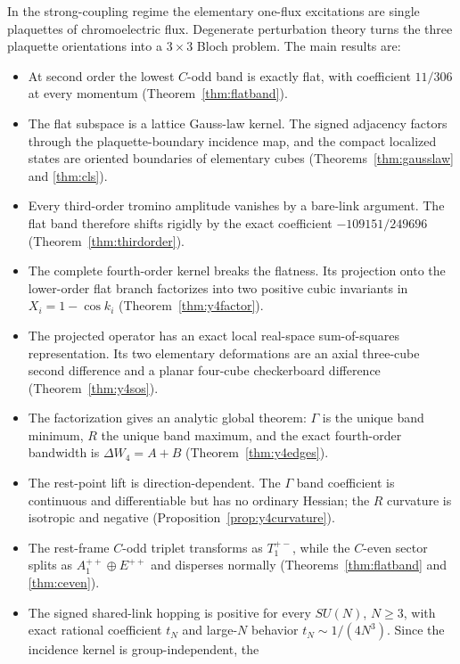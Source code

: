 \documentclass[11pt]{article}
\begin{document}
In the strong-coupling regime the elementary one-flux excitations are single
plaquettes of chromoelectric flux. Degenerate perturbation theory turns the
three plaquette orientations into a $3\times3$ Bloch problem. The main
results are:

\begin{itemize}
\item[(A)] At second order the lowest $C$-odd band is exactly flat, with
coefficient $11/306$ at every momentum (Theorem~\ref{thm:flatband}).
\item[(B)] The flat subspace is a lattice Gauss-law kernel. The signed
adjacency factors through the plaquette-boundary incidence map, and the
compact localized states are oriented boundaries of elementary cubes
(Theorems~\ref{thm:gausslaw} and \ref{thm:cls}).
\item[(C)] Every third-order tromino amplitude vanishes by a bare-link
argument. The flat band therefore shifts rigidly by the exact coefficient
$-109151/249696$ (Theorem~\ref{thm:thirdorder}).
\item[(D)] The complete fourth-order kernel breaks the flatness. Its
projection onto the lower-order flat branch factorizes into two positive
cubic invariants in $X_i=1-\cos k_i$ (Theorem~\ref{thm:y4factor}).
\item[(E)] The projected operator has an exact local real-space
sum-of-squares representation. Its two elementary deformations are an axial
three-cube second difference and a planar four-cube checkerboard difference
(Theorem~\ref{thm:y4sos}).
\item[(F)] The factorization gives an analytic global theorem: $\Gamma$ is
the unique band minimum, $R$ the unique band maximum, and the exact
fourth-order bandwidth is $\Delta W_4=A+B$
(Theorem~\ref{thm:y4edges}).
\item[(G)] The rest-point lift is direction-dependent. The $\Gamma$ band
coefficient is continuous and differentiable but has no ordinary Hessian;
the $R$ curvature is isotropic and negative
(Proposition~\ref{prop:y4curvature}).
\item[(H)] The rest-frame $C$-odd triplet transforms as $T_1^{+-}$, while
the $C$-even sector splits as $A_1^{++}\oplus E^{++}$ and disperses normally
(Theorems~\ref{thm:flatband} and \ref{thm:ceven}).
\item[(I)] The signed shared-link hopping is positive for every $SU(N)$,
$N\geq3$, with exact rational coefficient $t_N$ and large-$N$ behavior
$t_N\sim1/(4N^3)$. Since the incidence kernel is group-independent, the

\end{itemize}
\end{document}
